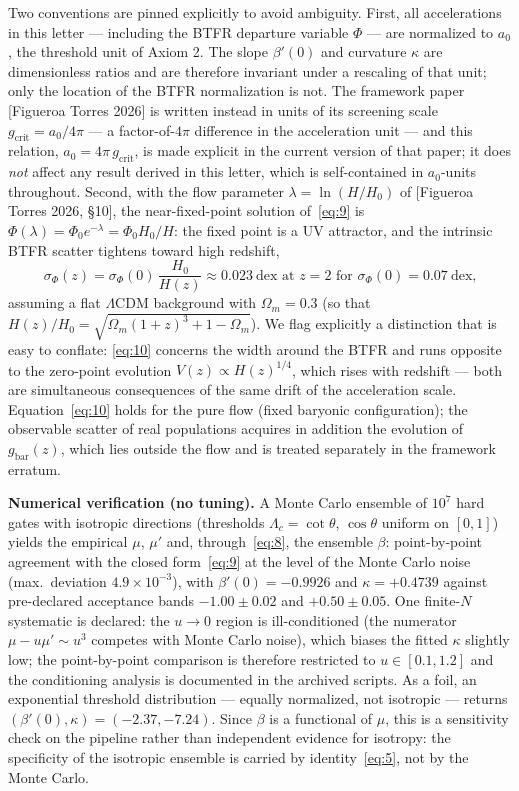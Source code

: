 \documentclass[11pt]{article}
\theoremstyle{plain}
\begin{document}
Two conventions are pinned explicitly to avoid ambiguity. First, all accelerations in this letter --- including the BTFR departure variable $\Phi$ --- are normalized to $a_0$, the threshold unit of Axiom 2. The slope $\beta'(0)$ and curvature $\kappa$ are dimensionless ratios and are therefore invariant under a rescaling of that unit; only the location of the BTFR normalization is not. The framework paper [Figueroa Torres 2026] is written instead in units of its screening scale $g_{\text{crit}} = a_0/4\pi$ --- a factor-of-$4\pi$ difference in the acceleration unit --- and this relation, $a_0 = 4\pi\,g_{\text{crit}}$, is made explicit in the current version of that paper; it does \emph{not} affect any result derived in this letter, which is self-contained in $a_0$-units throughout. Second, with the flow parameter $\lambda=\ln(H/H_0)$ of [Figueroa Torres 2026, \S10], the near-fixed-point solution of~\eqref{eq:9} is $\Phi(\lambda)=\Phi_0 e^{-\lambda} = \Phi_0 H_0/H$: the fixed point is a UV attractor, and the intrinsic BTFR scatter tightens toward high redshift,
\begin{equation*}\tag{10}\label{eq:10}
\sigma_\Phi(z) = \sigma_\Phi(0)\,\frac{H_0}{H(z)} \approx 0.023\ \text{dex at } z=2 \text{ for } \sigma_\Phi(0)=0.07\ \text{dex,}
\end{equation*}
assuming a flat $\Lambda$CDM background with $\Omega_m=0.3$ (so that $H(z)/H_0=\sqrt{\Omega_m(1+z)^3+1-\Omega_m}$). We flag explicitly a distinction that is easy to conflate: \eqref{eq:10} concerns the width around the BTFR and runs opposite to the zero-point evolution $V(z)\propto H(z)^{1/4}$, which rises with redshift --- both are simultaneous consequences of the same drift of the acceleration scale. Equation~\eqref{eq:10} holds for the pure flow (fixed baryonic configuration); the observable scatter of real populations acquires in addition the evolution of $g_{\text{bar}}(z)$, which lies outside the flow and is treated separately in the framework erratum.

\smallskip
\noindent\textbf{Numerical verification (no tuning).} A Monte Carlo ensemble of $10^7$ hard gates with isotropic directions (thresholds $\Lambda_c=\cot\theta$, $\cos\theta$ uniform on $[0,1]$) yields the empirical $\mu$, $\mu'$ and, through~\eqref{eq:8}, the ensemble $\beta$: point-by-point agreement with the closed form~\eqref{eq:9} at the level of the Monte Carlo noise (max.\ deviation $4.9\times10^{-3}$), with $\beta'(0) = -0.9926$ and $\kappa=+0.4739$ against pre-declared acceptance bands $-1.00\pm0.02$ and $+0.50\pm0.05$. One finite-$N$ systematic is declared: the $u\to0$ region is ill-conditioned (the numerator $\mu-u\mu'\sim u^3$ competes with Monte Carlo noise), which biases the fitted $\kappa$ slightly low; the point-by-point comparison is therefore restricted to $u\in[0.1,1.2]$ and the conditioning analysis is documented in the archived scripts. As a foil, an exponential threshold distribution --- equally normalized, not isotropic --- returns $(\beta'(0),\kappa) = (-2.37,-7.24)$. Since $\beta$ is a functional of $\mu$, this is a sensitivity check on the pipeline rather than independent evidence for isotropy: the specificity of the isotropic ensemble is carried by identity~\eqref{eq:5}, not by the Monte Carlo.
\end{document}

